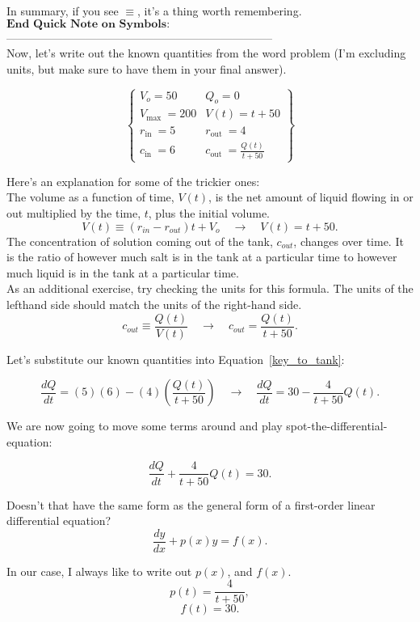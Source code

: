 \documentclass[a4paper,12pt]{article}
\begin{document}
In summary, if you see $\equiv$, it's a thing worth remembering.\\

$\boxed{\textbf{End Quick Note on Symbols:}}$-----------------------------------------------------------------------\\

Now, let's write out the known quantities from the word problem (I'm excluding units, but make sure to have them in your final answer).


$$\left\{\begin{array}{ll}V_o=50 & Q_o=0 \\ V_{\text {max }}=200 & V(t)=t+50 \\ r_{\text {in }}=5 & r_{\text {out }}=4 \\ c_{\text {in }}=6 & c_{\text {out }}=\frac{Q(t)}{t+50}\end{array}\right\}$$

Here's an explanation for some of the trickier ones:\\

The volume as a function of time, $V(t)$, is the net amount of liquid flowing in or out multiplied by the time, $t$, plus the initial volume.
$$ V(t) \equiv (r_{in} - r_{out})t + V_o \quad\rightarrow\quad V(t) = t + 50.
$$
The concentration of solution coming out of the tank, $c_{out}$, changes over time. It is the ratio of however much salt is in the tank at a particular time to however much liquid is in the tank at a particular time.\\

As an additional exercise, try checking the units for this formula. The units of the lefthand side should match the units of the right-hand side.
$$ 
 c_{out} \equiv \frac{Q(t)}{V(t)} \quad\rightarrow\quad  c_{out} = \frac{Q(t)}{t + 50}.
$$

Let's substitute our known quantities into Equation~\ref{key_to_tank}:

$$ \frac{dQ}{dt} = (5)(6) - (4) \left(\frac{Q(t)}{t + 50}\right) \quad\rightarrow\quad \frac{dQ}{dt} = 30 - \frac{4}{t + 50}Q(t).
 $$

We are now going to move some terms around and play spot-the-differential-equation:

$$ \frac{dQ}{dt} + \frac{4}{t + 50}Q(t) = 30. $$

Doesn't that have the same form as the general form of a first-order linear differential equation?
$$ \frac{dy}{dx} + p(x)y = f(x). $$

In our case, I always like to write out $p(x)$, and $f(x)$.
$$ p(t) = \frac{4}{t + 50}, $$
$$ f(t) = 30. $$
\end{document}
